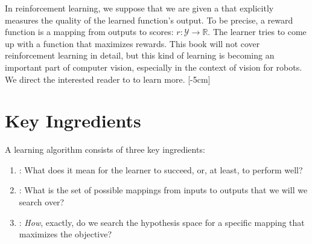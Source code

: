 In reinforcement learning, we suppose that we are given a
 that explicitly measures the quality of the learned function's output. To be precise, a reward function is a mapping from outputs to scores: $r: \mathcal{Y} \rightarrow \mathbb{R}$. The learner tries to come up with a function that maximizes rewards. This book will not cover reinforcement learning in detail, but this kind of learning is becoming an important part of computer vision, especially in the context of vision for robots. We direct the interested reader to \cite{sutton2018reinforcement} to learn more.%
[-5cm]


\section{Key Ingredients}
\label{sec:intro_to_learning:key_ingredients}

A learning algorithm consists of three key ingredients:
\begin{enumerate}
    \item {}: What does it mean for the learner to succeed, or, at least, to perform well?
    \item {}: What is the set of possible mappings from inputs to outputs that we will we search over?
    \item {}: \emph{How}, exactly, do we search the hypothesis space for a specific mapping that maximizes the objective?
\end{enumerate}

